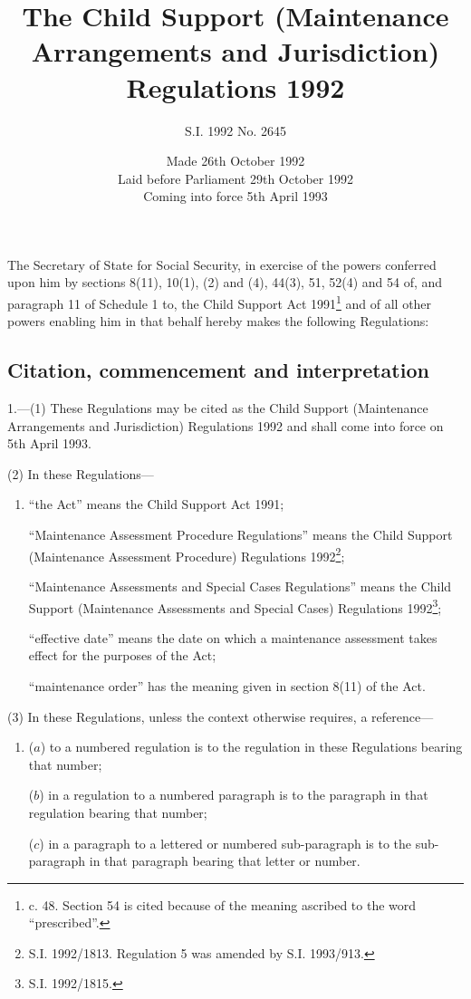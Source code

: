 \documentclass[a4paper]{article}
\title{The Child Support (Maintenance Arrangements and Jurisdiction) Regulations 1992}
\author{S.I. 1992 No. 2645}
\date{Made 26th October 1992\\Laid before Parliament 29th October 1992\\Coming into force 5th April 1993}
\begin{document}
\maketitle

\noindent
The Secretary of State for Social Security, in exercise of the powers conferred upon him by sections 8(11), 10(1), (2) and (4), 44(3), 51, 52(4) and 54 of, and paragraph 11 of Schedule 1 to, the Child Support Act 1991\footnote{ c. 48. Section 54 is cited because of the meaning ascribed to the word “prescribed”.} and of all other powers enabling him in that behalf hereby makes the following Regulations:

{\sloppy

\tableofcontents

}

\setcounter{secnumdepth}{-2}

\subsection[1. Citation, commencement and interpretation]{Citation, commencement and interpretation}

1.—(1) These Regulations may be cited as the Child Support (Maintenance Arrangements and Jurisdiction) Regulations 1992 and shall come into force on 5th April 1993.

(2) In these Regulations—
\begin{enumerate}\item[]
“the Act” means the Child Support Act 1991;

“Maintenance Assessment Procedure Regulations” means the Child Support (Maintenance Assessment Procedure) Regulations 1992\footnote{\frenchspacing S.I. 1992/1813. Regulation 5 was amended by S.I. 1993/913.};

“Maintenance Assessments and Special Cases Regulations” means the Child Support (Maintenance Assessments and Special Cases) Regulations 1992\footnote{\frenchspacing S.I. 1992/1815.};

“effective date” means the date on which a maintenance assessment takes effect for the purposes of the Act;

“maintenance order” has the meaning given in section 8(11) of the Act.
\end{enumerate}

(3) In these Regulations, unless the context otherwise requires, a reference—
\begin{enumerate}\item[]
($a$) to a numbered regulation is to the regulation in these Regulations bearing that number;

($b$) in a regulation to a numbered paragraph is to the paragraph in that regulation bearing that number;

($c$) in a paragraph to a lettered or numbered sub-paragraph is to the sub-paragraph in that paragraph bearing that letter or number.
\end{enumerate}
\end{document}
